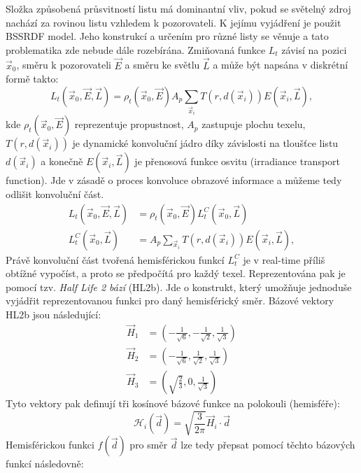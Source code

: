 Složka způsobená průsvitností listu má dominantní vliv, pokud se světelný zdroj nachází za rovinou listu vzhledem k pozorovateli. K jejímu vyjádření je použit BSSRDF model. Jeho konstrukcí a určením pro různé listy se věnuje \cite{Habel_2007_RTT} a tato problematika zde nebude dále rozebírána. Zmiňovaná funkce $L_t$ závisí na pozici $\vec{x}_0$, směru k pozorovateli $\vec{E}$ a směru ke světlu $\vec{L}$ a může být napsána v diskrétní formě takto:
\begin{equation}
\label{eq:bssrdf}
L_t(\vec{x}_0, \vec{E}, \vec{L}) = \rho_t(\vec{x}_0, \vec{E}) A_p \sum\limits_{\vec{x}_i} T(r, d(\vec{x}_i))E(\vec{x}_i, \vec{L}),
\end{equation}
kde $\rho_t(\vec{x}_0, \vec{E})$ reprezentuje propustnost, $A_p$ zastupuje plochu texelu, $T(r, d(\vec{x}_i))$ je dynamické konvoluční jádro díky závislosti na tloušťce listu $d(\vec{x}_i)$ a konečně $E(\vec{x}_i, \vec{L})$ je přenosová funkce osvitu (irradiance transport function). Jde v zásadě o proces konvoluce obrazové informace a můžeme tedy odlišit konvoluční část.
\begin{align}
\label{eq:bssrdf_convol}
L_t(\vec{x}_0, \vec{E}, \vec{L}) &= \rho_t(\vec{x}_0, \vec{E}) L_t^C( \vec{x}_0, \vec{L}) \\
L_t^C( \vec{x}_0, \vec{L})  &= A_p \sum\limits_{\vec{x}_i} T(r, d(\vec{x}_i))E(\vec{x}_i, \vec{L}),
\end{align}
 Právě konvoluční část tvořená hemisférickou funkcí $L_t^C$ je v real-time příliš obtížné vypočíst, a proto se předpočítá pro každý texel. Reprezentována pak je pomocí tzv. \emph{Half Life 2 bází} (HL2b). Jde o konstrukt, který umožňuje jednoduše vyjádřit reprezentovanou funkci pro daný hemisférický směr. Bázové vektory HL2b jsou následující:
\begin{align}
\label{eq:hl2b_vectors}
\vec{H}_1 &= (-\frac{1}{\sqrt{6}}, -\frac{1}{\sqrt{2}}, \frac{1}{\sqrt{3}}) \nonumber\\
\vec{H}_2 &= (-\frac{1}{\sqrt{6}}, \frac{1}{\sqrt{2}}, \frac{1}{\sqrt{3}}) \nonumber \\
\vec{H}_3 &= (\sqrt{\frac{2}{3}}, 0, \frac{1}{\sqrt{3}})
\end{align}
Tyto vektory pak definují tři kosínové bázové funkce na polokouli (hemisféře):
\begin{equation}
\label{eq:hl2b_cosineFunctions}
\mathcal{H}_i(\vec{d}) = \sqrt{\frac{3}{2\pi}}\vec{H}_i \cdot \vec{d}
\end{equation}
Hemisférickou funkci $f(\vec{d})$ pro směr $\vec{d}$  lze tedy přepsat pomocí těchto bázových funkcí následovně:

